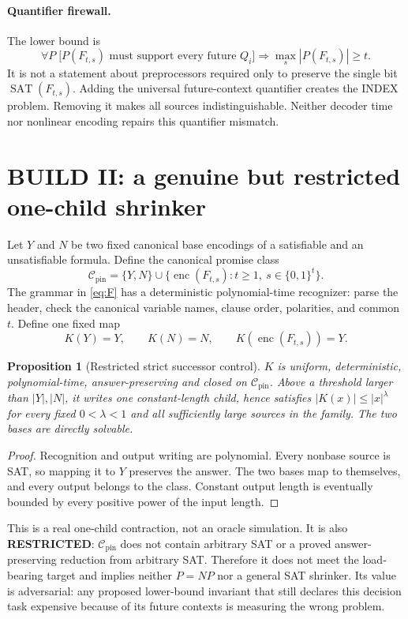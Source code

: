 \documentclass[11pt]{article}
\newtheorem{proposition}[theorem]{Proposition}
\begin{document}
\paragraph{Quantifier firewall.}
The lower bound is
\[
 \forall P\;\bigl[P(F_{t,s})\text{ must support every future }Q_i\bigr]
 \Longrightarrow \max_s |P(F_{t,s})|\ge t.
\]
It is not a statement about preprocessors required only to preserve the single
bit $\operatorname{SAT}(F_{t,s})$.  Adding the universal future-context
quantifier creates the INDEX problem.  Removing it makes all sources
indistinguishable.  Neither decoder time nor nonlinear encoding repairs this
quantifier mismatch.

\section{BUILD II: a genuine but restricted one-child shrinker}
Let $Y$ and $N$ be two fixed canonical base encodings of a satisfiable and an
unsatisfiable formula.  Define the canonical promise class
\[
 \mathcal C_{\mathrm{pin}}=\{Y,N\}\cup
 \{\operatorname{enc}(F_{t,s}):t\ge1,\ s\in\{0,1\}^t\}.
\]
The grammar in \eqref{eq:F} has a deterministic polynomial-time recognizer:
parse the header, check the canonical variable names, clause order, polarities,
and common $t$.  Define one fixed map
\[
 K(Y)=Y,\qquad K(N)=N,\qquad K(\operatorname{enc}(F_{t,s}))=Y.
\]

\begin{proposition}[Restricted strict successor control]\label{prop:K}
$K$ is uniform, deterministic, polynomial-time, answer-preserving and closed on
$\mathcal C_{\mathrm{pin}}$.  Above a threshold larger than $|Y|,|N|$, it
writes one constant-length child, hence satisfies $|K(x)|\le |x|^\lambda$ for
every fixed $0<\lambda<1$ and all sufficiently large sources in the family.
The two bases are directly solvable.
\end{proposition}
\begin{proof}
Recognition and output writing are polynomial.  Every nonbase source is SAT,
so mapping it to $Y$ preserves the answer.  The two bases map to themselves,
and every output belongs to the class.  Constant output length is eventually
bounded by every positive power of the input length.
\end{proof}

This is a real one-child contraction, not an oracle simulation.  It is also
\textbf{RESTRICTED}: $\mathcal C_{\mathrm{pin}}$ does not contain arbitrary SAT
or a proved answer-preserving reduction from arbitrary SAT.  Therefore it does
not meet the load-bearing target and implies neither $P=NP$ nor a general SAT
shrinker.  Its value is adversarial: any proposed lower-bound invariant that
still declares this decision task expensive because of its future contexts is
measuring the wrong problem.
\end{document}
